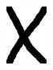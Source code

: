 \documentclass[russian,utf8,emptystyle]{eskdtext}
\begin{document}
\begin{figure}[!htb]
\includegraphics[width=\linewidth]{../data/learn/x/001}
\endminipage\hfill


\end{figure}
\end{document}
